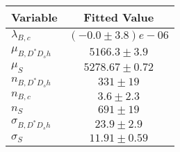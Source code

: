 \begin{tabular}[t]{lc}
\hline
Variable &Fitted Value\\
\hline\hline
$\lambda_{B,c}$&$(-0.0\pm3.8)e-06$\\
\hline
$\mu_{B, D^* D_s h}$&$5166.3\pm3.9$\\
\hline
$\mu_S$&$5278.67\pm0.72$\\
\hline
$n_{B, D^* D_s h}$&$331\pm19$\\
\hline
$n_{B,c}$&$3.6\pm2.3$\\
\hline
$n_S$&$691\pm19$\\
\hline
$\sigma_{B, D^* D_s h}$&$23.9\pm2.9$\\
\hline
$\sigma_S$&$11.91\pm0.59$\\
\hline
\end{tabular}